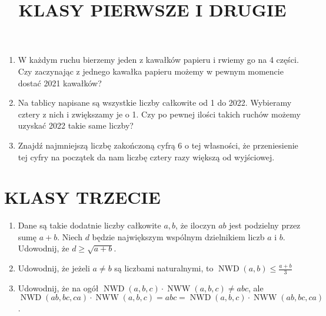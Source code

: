 \documentclass[10pt]{article}
\title{KLASY PIERWSZE I DRUGIE }
\author{}
\date{}
\begin{document}
\maketitle
\begin{enumerate}
  \item W każdym ruchu bierzemy jeden z kawałków papieru i rwiemy go na 4 części. Czy zaczynając z jednego kawałka papieru możemy w pewnym momencie dostać 2021 kawałków?
  \item Na tablicy napisane są wszystkie liczby całkowite od 1 do 2022. Wybieramy cztery z nich i zwiększamy je o 1. Czy po pewnej ilości takich ruchów możemy uzyskać 2022 takie same liczby?
  \item Znajdź najmniejszą liczbę zakończoną cyfrą 6 o tej własności, że przeniesienie tej cyfry na początek da nam liczbę cztery razy większą od wyjściowej.
\end{enumerate}

\section*{KLASY TRZECIE}
\begin{enumerate}
  \item Dane są takie dodatnie liczby całkowite \(a, b\), że iloczyn \(a b\) jest podzielny przez sumę \(a+b\). Niech \(d\) będzie największym wspólnym dzielnikiem liczb \(a\) i \(b\). Udowodnij, że \(d \geq \sqrt{a+b}\).
  \item Udowodnij, że jeżeli \(a \neq b\) są liczbami naturalnymi, to \(\operatorname{NWD}(a, b) \leq \frac{a+b}{3}\)
  \item Udowodnij, że na ogół \(\operatorname{NWD}(a, b, c) \cdot \operatorname{NWW}(a, b, c) \neq a b c\), ale \(\operatorname{NWD}(a b, b c, c a) \cdot \operatorname{NWW}(a, b, c)=a b c=\operatorname{NWD}(a, b, c) \cdot \operatorname{NWW}(a b, b c, c a)\).
\end{enumerate}
\end{document}
